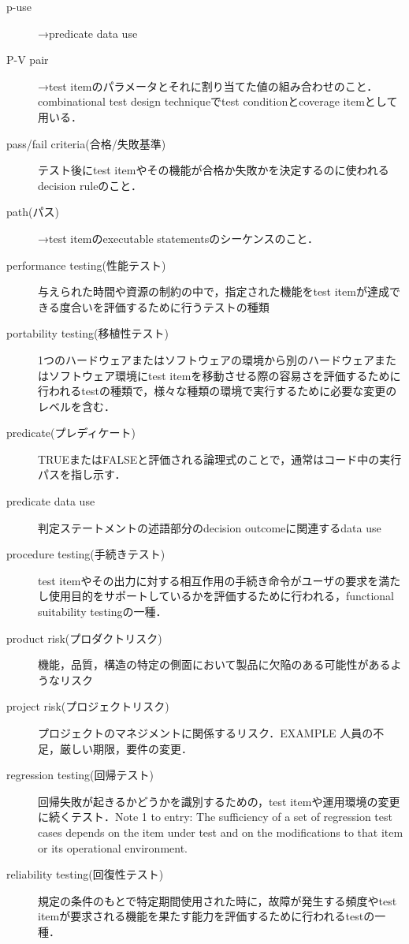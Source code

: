 \begin{description}
    \item[p-use]→predicate data use
    \item[P-V pair]→test itemのパラメータとそれに割り当てた値の組み合わせのこと．combinational test design techniqueでtest conditionとcoverage itemとして用いる．
    \item[pass/fail criteria(合格/失敗基準)]テスト後にtest itemやその機能が合格か失敗かを決定するのに使われるdecision ruleのこと．
    \item[path(パス)]→test itemのexecutable statementsのシーケンスのこと．
    \item[performance testing(性能テスト)]与えられた時間や資源の制約の中で，指定された機能をtest itemが達成できる度合いを評価するために行うテストの種類
    \item[portability testing(移植性テスト)]1つのハードウェアまたはソフトウェアの環境から別のハードウェアまたはソフトウェア環境にtest itemを移動させる際の容易さを評価するために行われるtestの種類で，様々な種類の環境で実行するために必要な変更のレベルを含む．
    \item[predicate(プレディケート)]{\sf TRUE}または{\sf FALSE}と評価される論理式のことで，通常はコード中の実行パスを指し示す．
    \item[predicate data use]判定ステートメントの述語部分のdecision outcomeに関連するdata use
    \item[procedure testing(手続きテスト)]test itemやその出力に対する相互作用の手続き命令がユーザの要求を満たし使用目的をサポートしているかを評価するために行われる，functional suitability testingの一種．
    \item[product risk(プロダクトリスク)]機能，品質，構造の特定の側面において製品に欠陥のある可能性があるようなリスク
    \item[project risk(プロジェクトリスク)]プロジェクトのマネジメントに関係するリスク．EXAMPLE 人員の不足，厳しい期限，要件の変更．
    \item[regression testing(回帰テスト)]回帰失敗が起きるかどうかを識別するための，test itemや運用環境の変更に続くテスト．Note 1 to entry: The sufficiency of a set of regression test cases depends on the item under test and on the modifications to that item or its operational environment.
    \item[reliability testing(回復性テスト)]規定の条件のもとで特定期間使用された時に，故障が発生する頻度やtest itemが要求される機能を果たす能力を評価するために行われるtestの一種．

\end{description}
